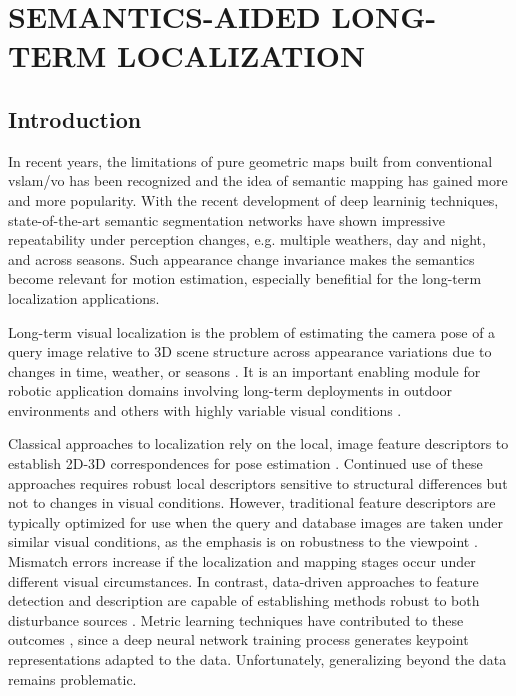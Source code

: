 \chapter{SEMANTICS-AIDED LONG-TERM LOCALIZATION}

\section{Introduction}
 
In recent years, the limitations of pure geometric maps built from conventional \acrshort{vslam}/\acrshort{vo} has been recognized and the idea of semantic mapping has gained more and more popularity. 
With the recent development of deep learninig techniques, state-of-the-art semantic segmentation networks have shown impressive repeatability under perception changes, e.g. multiple weathers, day and night, and across seasons. 
Such appearance change invariance makes the semantics become relevant for motion estimation, especially benefitial for the long-term localization applications. 

Long-term visual localization is the problem of estimating the camera pose of a query image relative to 3D scene structure across appearance variations due to changes in time, weather, or seasons \cite{sattler2018benchmarking}. 
It is an important enabling module for robotic application domains involving long-term deployments in outdoor environments and others with highly variable visual conditions  \cite{dayoub2008adaptive,krajnik2014long,valgren2010sift,stenborg2018long}.

Classical approaches to localization rely on the local, image feature descriptors to establish 2D-3D correspondences for pose estimation \cite{liu2017efficient,geppert2019efficient,sarlin2019coarse}.
Continued use of these approaches requires robust local descriptors sensitive to structural differences but not to changes in visual conditions.
However, traditional feature descriptors are typically optimized for use when the query and database images are taken under similar visual conditions, as the emphasis is on robustness to the viewpoint \cite{balntas2017hpatches,schonberger2017comparative}.
Mismatch errors increase if the localization and mapping stages occur under different visual circumstances.
In contrast, data-driven approaches to feature detection and description are capable of establishing methods robust to both disturbance sources 
\cite{detone2018superpoint,dusmanu2019d2,revaud2019r2d2,luo2020aslfeat}. 
Metric learning techniques have contributed to these outcomes \cite{mishchuk2017working}, since a deep neural network training process generates keypoint representations adapted to the data.  
Unfortunately, generalizing beyond the data remains problematic.


